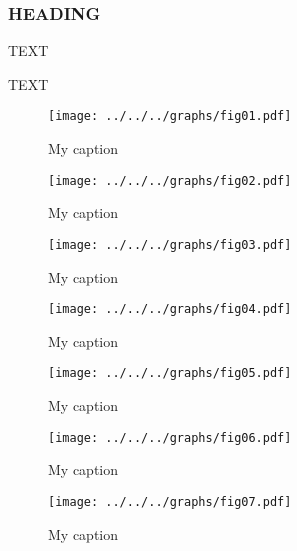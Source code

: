 \documentclass[essd, manuscript]{copernicus}
\begin{document}
\subsubsection{HEADING}
TEXT


\conclusions  %
TEXT






\begin{figure}[t]
    \texttt{[image: ../../../graphs/fig01.pdf]}
    \caption{My caption}
\end{figure}

\clearpage

\begin{figure}[t]
    \texttt{[image: ../../../graphs/fig02.pdf]}
    \caption{My caption}
\end{figure}

\clearpage

\begin{figure}[t]
    \texttt{[image: ../../../graphs/fig03.pdf]}
    \caption{My caption}
\end{figure}

\clearpage

\begin{figure}[t]
    \texttt{[image: ../../../graphs/fig04.pdf]}
    \caption{My caption}
\end{figure}

\clearpage

\begin{figure}[t]
    \texttt{[image: ../../../graphs/fig05.pdf]}
    \caption{My caption}
\end{figure}

\clearpage

\begin{figure}[t]
    \texttt{[image: ../../../graphs/fig06.pdf]}
    \caption{My caption}
\end{figure}

\clearpage

\begin{figure}[t]
    \texttt{[image: ../../../graphs/fig07.pdf]}
    \caption{My caption}
\end{figure}
\end{document}
